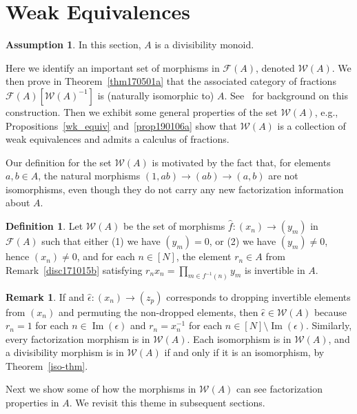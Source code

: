 \documentclass[reqno]{amsart}
\theoremstyle{plain}
\theoremstyle{definition}
\newtheorem{defn}[lem]{Definition}
\newtheorem{disc}[lem]{Remark}
\newtheorem*{assumption}{Assumption}
\newcommand{\cat}[1]{\mathcal{#1}}
\newcommand{\catw}{\cat{W}}
\newcommand{\catf}{\cat{F}}
\newcommand{\im}{\operatorname{Im}}
\newcommand{\emptytuple}{\mathfrak{0}}
\numberwithin{equation}{lem}
\begin{document}
\section{Weak Equivalences}\label{model-category}

\begin{assumption}
In this section, $A$ is a divisibility monoid.
\end{assumption}

Here we identify an important set of morphisms in $\catf(A)$, denoted
$\catw(A)$.
We then prove in Theorem~\ref{thm170501a} that the associated 
category of fractions $\catf(A)[\catw(A)^{-1}]$
is (naturally isomorphic to) $A$.
See~\cite{MR1406095,MR0210125} for background on this construction.
Then we exhibit some general properties of the set $\catw(A)$, e.g., 
Propositions~\ref{wk_equiv} and~\ref{prop190106a} show that $\catw(A)$ is a collection of weak equivalences
and admits a calculus of fractions.

Our definition for the set $\catw(A)$
is motivated by the 
fact that, for elements $a,b\in A$, the natural morphisms $(1,ab)\to(ab)\to(a,b)$ are not isomorphisms,
even though they do not carry any new factorization information about $A$.


\begin{defn}\label{defn170501d}
Let $\catw(A)$ be the set of morphisms $\hat{f}\colon(x_n) \to (y_m)$ in $\mathcal{F}(A)$ 
such that either (1) we have $(y_m)=\emptytuple$, or (2) we have $(y_m)\neq\emptytuple$, hence $(x_n)\neq\emptytuple$, 
and for each $n \in [N]$,
the element $r_n\in A$ from Remark~\ref{disc171015b} satisfying $r_nx_n =  \prod_{m \in f^{-1}(n)} y_m$
is  invertible in $A$.
\end{defn}

\begin{disc}\label{disc170501a}
If 
and $\hat\epsilon\colon(x_n)\to(z_p)$
corresponds to dropping invertible elements from $(x_n)$ and permuting the non-dropped elements,
then $\hat\epsilon\in\catw(A)$ because $r_n=1$ for each $n\in\im(\epsilon)$ and $r_n=x_n^{-1}$ for each $n\in[N]\setminus\im(\epsilon)$.
Similarly, 
every factorization morphism
is in $\catw(A)$.
Each isomorphism
is in $\catw(A)$, and a divisibility morphism is in $\catw(A)$ if and only if it is an isomorphism, by Theorem~\ref{iso-thm}.
\end{disc}

Next we show some of how the morphisms in $\catw(A)$ can see factorization properties in $A$.
We revisit this theme in subsequent sections.
\end{document}
